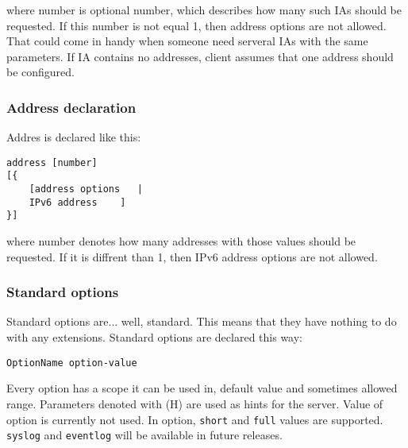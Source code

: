 where number is optional number, which describes how many such IAs
should be requested. If this number is not equal 1, then address
options are not allowed. That could come in handy when someone need
serveral IAs with the same parameters. If IA contains no addresses,
client assumes that one address should be configured.


\subsubsection{Address declaration}
Addres is declared like this:

\begin{verbatim}
address [number] 
[{ 
	[address options   |
	IPv6 address    ] 
}]
\end{verbatim}
where number denotes how many addresses with those values should be
requested. If it is diffrent than 1, then IPv6 address options are not
allowed.

\subsubsection{Standard options}
Standard options are... well, standard. This means that they have 
nothing to do with any extensions. Standard options are declared this way:

\begin{verbatim}
OptionName option-value
\end{verbatim}

Every option has a scope it can be used in, default value and
sometimes allowed range. Parameters denoted with (H) are used as hints
for the server. Value of  option is currently not
used. In  option, \verb+short+ and \verb+full+ values are
supported. \verb+syslog+ and \verb+eventlog+ will be available in future releases.

